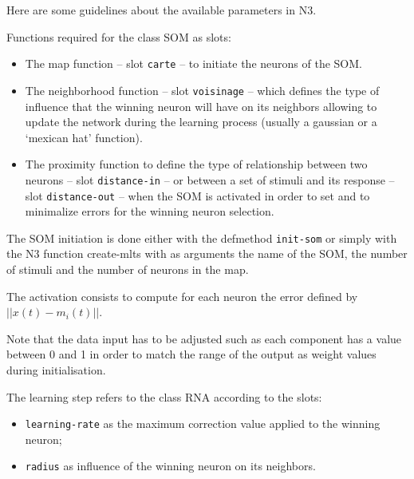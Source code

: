 \bigskip

Here are some guidelines about the available parameters in N3.

\bigskip
Functions required for the class SOM as slots:

\begin{itemize}
\item The map function -- slot \texttt{carte} -- to initiate the neurons of the SOM.
\item The neighborhood function -- slot \texttt{voisinage} -- which defines the type of influence that the winning neuron will have on its neighbors allowing to update the network during the learning process (usually a gaussian or a `mexican hat' function).
\item The proximity function to define the type of relationship %
between two neurons -- slot \texttt{distance-in} --  
or between a set of stimuli and its response -- slot \texttt{distance-out} -- when the SOM is activated in order to set and to minimalize errors for the winning neuron selection.
\end{itemize}

\bigskip

The SOM initiation is done either with the defmethod \texttt{init-som} or simply with the N3 function \glspl{create-mlt} with as arguments the name of the SOM, the number of stimuli and the number of neurons in the map.

\smallskip

The activation consists to compute for each neuron the error defined by $|| x(t) - m_i(t) ||$. 

\smallskip

Note that the data input has to be adjusted such as each component has a value between 0 and 1 in order to match the range of the output as weight values during initialisation.

\bigskip

The learning step refers to the class RNA according to the slots:

\begin{itemize}
\item \texttt{learning-rate} as the maximum correction value applied to the winning neuron;
\item \texttt{radius} as influence of the winning neuron on its neighbors. 
\end{itemize}

